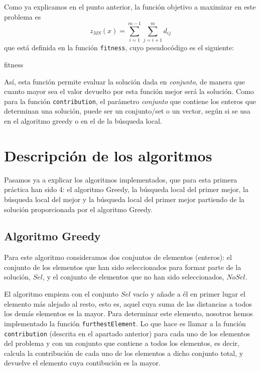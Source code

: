 \documentclass[11pt,a4paper]{article}
\begin{document}
	Como ya explicamos en el punto anterior, la función objetivo a maximizar en este problema es 
	$$ z_{MS}(x) = \sum_{i=1}^{m-1} \sum_{j=i+1}^{m} d_{ij} $$ que está definida en la función \lstinline|fitness|, cuyo pesudocódigo es el siguiente:
		
	\begin{algorithm}[H]
	\caption{\sc fitness}
	\end{algorithm}

	Así, esta función permite evaluar la solución dada en \textit{conjunto}, de manera que cuanto mayor sea el valor devuelto por esta función mejor será la solución. Como para la función \lstinline|contribution|, el parámetro \textit{conjunto} que contiene los enteros que determinan una solución, puede ser un conjunto/set o un vector, según si se usa en el algoritmo greedy o en el de la búsqueda local. 
	\newpage
	
	\section{Descripción de los algoritmos}
	
	Pasamos ya a explicar los algoritmos implementados, que para esta primera práctica han sido 4: el algoritmo Greedy, la búsqueda local del primer mejor, la búsqueda local del mejor y la búsqueda local del primer mejor partiendo de la solución proporcionada por el algoritmo Greedy. 
		
	\subsection{Algoritmo Greedy}
	
	Para este algoritmo consideramos dos conjuntos de elementos (enteros): el conjunto de los elementos que han sido seleccionados para formar parte de la solución, $Sel$, y el conjunto de elementos que no han sido seleccionados, $NoSel$. 
	
	El algoritmo empieza con el conjunto $Sel$ vacío y añade a él en primer lugar el elemento más alejado al resto, esto es, aquel cuya suma de las distancias a todos los demás elementos es la mayor. Para determinar este elemento, nosotros hemos implementado la función \lstinline|furthestElement|. Lo que hace es llamar a la función \lstinline|contribution| (descrita en el apartado anterior) para cada uno de los elementos del problema y con un conjunto que contiene a todos los elementos, es decir, calcula la contribución de cada uno de los elementos a dicho conjunto total, y devuelve el elemento cuya contibución es la mayor. 
\end{document}
